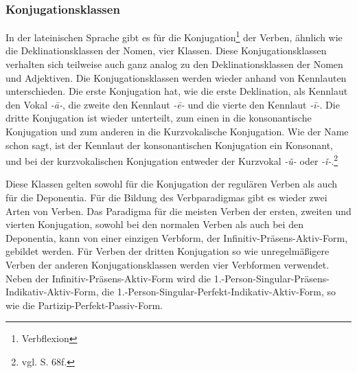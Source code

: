 \documentclass[fontsize=12pt,abstract=on,titlepage,bibliography=totoc,ngerman,listof=totoc]{scrreprt}
\begin{document}
\subsubsection{Konjugationsklassen}
In der lateinischen Sprache gibt es für die Konjugation\footnote{Verbflexion} der Verben, ähnlich wie die Deklinationsklassen der Nomen, vier Klassen. Diese Konjugationsklassen verhalten sich teilweise auch ganz analog zu den Deklinationsklassen der Nomen und Adjektiven. Die Konjugationsklassen werden wieder anhand von Kennlauten unterschieden. Die erste Konjugation hat, wie die erste Deklination, als Kennlaut den Vokal \textit{-ā-}, die zweite den Kennlaut \textit{-ē-} und die vierte den Kennlaut \textit{-ī-}. Die dritte Konjugation ist wieder unterteilt, zum einen in die konsonantische Konjugation und zum anderen in die Kurzvokalische Konjugation. Wie der Name schon sagt, ist der Kennlaut der konsonantischen Konjugation ein Konsonant, und bei der kurzvokalischen Konjugation entweder der Kurzvokal \textit{-ǔ-} oder \textit{-ǐ-}.\footnote{vgl. \cite{BAYER-LINDAUER1994} S. 68f.} \par
Diese Klassen gelten sowohl für die Konjugation der regulären Verben als auch für die Deponentia. Für die Bildung des Verbparadigmas gibt es wieder zwei Arten von Verben. Das Paradigma für die meisten Verben der ersten, zweiten und vierten Konjugation, sowohl bei den normalen Verben als auch bei den Deponentia, kann von einer einzigen Verbform, der Infinitiv-Präsens-Aktiv-Form, gebildet werden. Für Verben der dritten Konjugation so wie unregelmäßigere Verben der anderen Konjugationsklassen werden vier Verbformen verwendet. Neben der Infinitiv-Präsens-Aktiv-Form wird die 1.-Person-Singular-Präsens-Indikativ-Aktiv-Form, die 1.-Person-Singular-Perfekt-Indikativ-Aktiv-Form, so wie die Partizip-Perfekt-Passiv-Form.  \par
\end{document}
